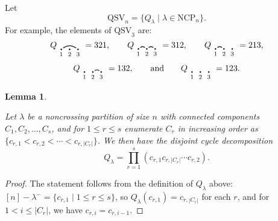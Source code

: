 \documentclass[12pt]{amsart}
\newtheorem{lem}[equation]{Lemma}
\theoremstyle{definition}
\theoremstyle{remark}
\numberwithin{equation}{section}
\renewcommand{\setminus}{-}
\newcommand{\QSV}{\mathrm{QSV}}
\newcommand{\NCP}{\mathrm{NCP}}
\begin{document}
Let
\[
\QSV_{n} = \{Q_{\lambda} \;|\; \lambda \in \NCP_{n} \}.
\]
For example, the elements of $\QSV_{3}$ are:
\[
Q_{\begin{tikzpicture}[scale = 0.35, baseline = 0.35*-0.2]
\foreach \x in {1, ..., 3}{\draw[fill] (\x - 1, 0) circle (2pt) node[inner sep = 2pt] (\x) {};}
\foreach \x in {1, ..., 3}{\node[below] at (\x) {$\scriptstyle \x$};}
\foreach \i\j in {1/3}{\draw[thick] (\i) to[out = 35, in = 145] (\j);}
\end{tikzpicture}} = 321, \qquad
Q_{\begin{tikzpicture}[scale = 0.35, baseline = 0.35*-0.2]
\foreach \x in {1, ..., 3}{\draw[fill] (\x - 1, 0) circle (2pt) node[inner sep = 2pt] (\x) {};}
\foreach \x in {1, ..., 3}{\node[below] at (\x) {$\scriptstyle \x$};}
\foreach \i\j in {1/2, 2/3}{\draw[thick] (\i) to[out = 35, in = 145] (\j);}
\end{tikzpicture}} = 312, \qquad
Q_{\begin{tikzpicture}[scale = 0.35, baseline = 0.35*-0.2]
\foreach \x in {1, ..., 3}{\draw[fill] (\x - 1, 0) circle (2pt) node[inner sep = 2pt] (\x) {};}
\foreach \x in {1, ..., 3}{\node[below] at (\x) {$\scriptstyle \x$};}
\foreach \i\j in {1/2}{\draw[thick] (\i) to[out = 35, in = 145] (\j);}
\end{tikzpicture}} = 213, 
\]
\[
Q_{\begin{tikzpicture}[scale = 0.35, baseline = 0.35*-0.2]
\foreach \x in {1, ..., 3}{\draw[fill] (\x - 1, 0) circle (2pt) node[inner sep = 2pt] (\x) {};}
\foreach \x in {1, ..., 3}{\node[below] at (\x) {$\scriptstyle \x$};}
\foreach \i\j in {2/3}{\draw[thick] (\i) to[out = 35, in = 145] (\j);}
\end{tikzpicture}} = 132, \qquad\text{and}\qquad
Q_{\begin{tikzpicture}[scale = 0.35, baseline = 0.35*-0.2]
\foreach \x in {1, ..., 3}{\draw[fill] (\x - 1, 0) circle (2pt) node[inner sep = 2pt] (\x) {};}
\foreach \x in {1, ..., 3}{\node[below] at (\x) {$\scriptstyle \x$};}
\end{tikzpicture}} = 123.
\]

\begin{lem}
\label{lem:QSVcycles}

Let $\lambda$ be a noncrossing partition of size $n$ with connected components $C_{1}, C_{2}, \ldots, C_{s}$, and for $1 \le r \le s$ enumerate $C_{r}$ in increasing order as $\{c_{r, 1} < c_{r, 2} < \cdots < c_{r, |C_{r}|}\}$. 
We then have the disjoint cycle decomposition
\[
Q_{\lambda} = \prod_{r = 1}^{s} (c_{r, 1} c_{r, |C_{r}|} \cdots c_{r, 2}).
\]
\end{lem}
\begin{proof}
The statement follows from the definition of $Q_{\lambda}$ above: $[n] \setminus \lambda^{-} = \{c_{r, 1} \;|\; 1 \le r \le s\}$, so $Q_{\lambda}(c_{r, 1}) =  c_{r, |C_{r}|}$ for each $r$, and for $1 < i \le |C_{r}|$, we have $c_{r, i} = c_{r, i-1}$.
\end{proof}
\end{document}

